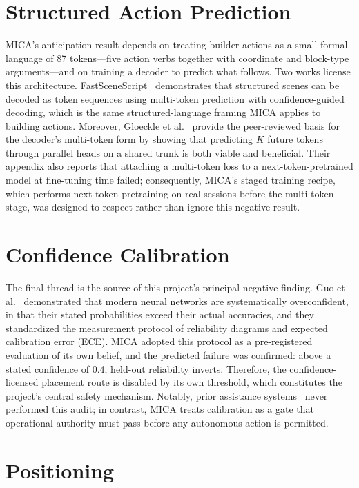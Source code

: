 \documentclass[12pt]{article}
\begin{document}
\section{Structured Action Prediction}

MICA's anticipation result depends on treating builder actions as a small formal
language of 87 tokens---five action verbs together with coordinate and
block-type arguments---and on training a decoder to predict what follows. Two
works license this architecture. FastSceneScript~\cite{fastscenescript}
demonstrates that structured scenes can be decoded as token sequences using
multi-token prediction with confidence-guided decoding, which is the same
structured-language framing MICA applies to building actions. Moreover, Gloeckle
et al.~\cite{mtp} provide the peer-reviewed basis for the decoder's multi-token
form by showing that predicting $K$ future tokens through parallel heads on a
shared trunk is both viable and beneficial. Their appendix also reports that
attaching a multi-token loss to a next-token-pretrained model at fine-tuning
time failed; consequently, MICA's staged training recipe, which performs
next-token pretraining on real sessions before the multi-token stage, was
designed to respect rather than ignore this negative result.

\section{Confidence Calibration}

The final thread is the source of this project's principal negative finding.
Guo et al.~\cite{guo} demonstrated that modern neural networks are
systematically overconfident, in that their stated probabilities exceed their
actual accuracies, and they standardized the measurement protocol of reliability
diagrams and expected calibration error (ECE). MICA adopted this protocol as a
pre-registered evaluation of its own belief, and the predicted failure was
confirmed: above a stated confidence of 0.4, held-out reliability inverts.
Therefore, the confidence-licensed placement route is disabled by its own
threshold, which constitutes the project's central safety mechanism. Notably,
prior assistance systems~\cite{wah,nopa,assistancezero} never performed this
audit; in contrast, MICA treats calibration as a gate that operational authority
must pass before any autonomous action is permitted.

\section{Positioning}
\end{document}
